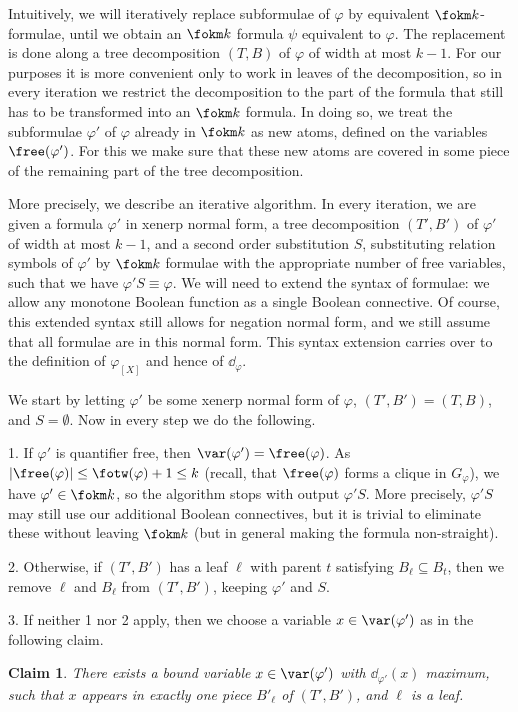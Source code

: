 \documentclass{LMCS}
\newtheorem{clam}{Claim}
\newcommand{\gfi}{G_{\varphi}}
\renewcommand{\phi}{\varphi}
\newcommand{\ad}{\dd_{\varphi}}
\begin{document}
Intuitively, we will iteratively replace subformulae of $\phi$ 
by equivalent $\fokm k$-formulae, 
until we obtain an $\fokm k$ formula $\psi$ equivalent to $\phi$.
The replacement is done along a tree decomposition $(T,B)$ of $\phi$ of width
at most $k-1$. For our purposes
it is more convenient only to work in leaves of the decomposition, so in every
iteration we restrict the decomposition to the part of the formula that still
has to be transformed into an $\fokm k$ formula. 
In doing so, 
we treat the subformulae $\phi'$ of $\phi$ already in $\fokm k$ as new atoms, 
defined on the variables $\free(\phi')$. 
For this we make sure that these new atoms 
are covered in some piece of the remaining part of the tree decomposition. 

More precisely, we describe an iterative algorithm. 
In every iteration, we are given a formula $\phi'$ in xenerp normal form, 
a tree decomposition $(T',B')$ of $\phi'$ of width at most $k-1$, 
and a second order substitution $S$, 
substituting relation symbols of $\phi'$ 
by $\fokm k$ formulae with the appropriate number of free variables, 
such that we have $\phi'S\equiv\phi$.
We will need to extend the syntax of formulae: 
we allow any monotone Boolean function as a single Boolean connective. 
Of course, this extended syntax still allows for negation normal form, 
and we still assume that all formulae are in this normal form. 
This syntax extension carries over 
to the definition of $\phi_{[X]}$ and hence of $\ad$. 


We start by letting $\phi'$ be some xenerp normal form of $\phi$, 
$(T',B')=(T,B)$, and $S=\emptyset$. 
Now in every step we do the following. 

1. If $\phi'$ is quantifier free, then $\var(\phi')=\free(\phi)$. 
As $|\free(\phi)|\leq\fotw(\phi)+1\leq k$ 
(recall, that $\free(\phi)$ forms a clique in $\gfi$), 
we have $\phi'\in\fokm k$, so the algorithm stops with output $\phi'S$. 
More precisely, $\phi'S$ may still use our additional Boolean connectives, 
but it is trivial to eliminate these without leaving $\fokm k$ 
(but in general making the formula non-straight). 

2. Otherwise, if $(T',B')$ has a leaf $\ell$ with parent $t$ satisfying
$B_{\ell}\subseteq B_t$, then we remove $\ell$ and $B_{\ell}$ from $(T',B')$,
keeping $\phi'$ and $S$.

3. If neither 1 nor 2 apply, 
then we choose a variable $x\in \var(\phi')$ 
as in the following claim.

\begin{clam}
There exists a bound variable $x\in \var(\phi')$
with $\dd_{\phi'}(x)$ maximum, 
such that $x$ appears in exactly one piece $B'_{\ell}$ of $(T',B')$, 
and $\ell$ is a leaf. 
\end{clam}
\end{document}

